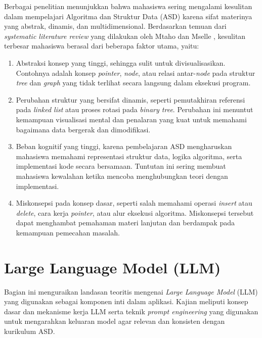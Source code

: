 Berbagai penelitian menunjukkan bahwa mahasiswa sering mengalami kesulitan dalam mempelajari Algoritma dan Struktur Data (ASD) karena sifat materinya yang abstrak, dinamis, dan multidimensional. Berdasarkan temuan dari \textit{systematic literature review} yang dilakukan oleh Mtaho dan Mselle \cite{Mtaho2024}, kesulitan terbesar mahasiswa berasal dari beberapa faktor utama, yaitu:

\begin{enumerate}
    \item Abstraksi konsep yang tinggi, sehingga sulit untuk divisualisasikan. Contohnya adalah konsep \textit{pointer}, \textit{node}, atau relasi antar-\textit{node} pada struktur \textit{tree} dan \textit{graph} yang tidak terlihat secara langsung dalam eksekusi program.

    \item Perubahan struktur yang bersifat dinamis, seperti pemutakhiran referensi pada \textit{linked list} atau proses rotasi pada \textit{binary tree}. Perubahan ini menuntut kemampuan visualisasi mental dan penalaran yang kuat untuk memahami bagaimana data bergerak dan dimodifikasi.

    \item Beban kognitif yang tinggi, karena pembelajaran ASD mengharuskan mahasiswa memahami representasi struktur data, logika algoritma, serta implementasi kode secara bersamaan. Tuntutan ini sering membuat mahasiswa kewalahan ketika mencoba menghubungkan teori dengan implementasi.

    \item Miskonsepsi pada konsep dasar, seperti salah memahami operasi \textit{insert} atau \textit{delete}, cara kerja \textit{pointer}, atau alur eksekusi algoritma. Miskonsepsi tersebut dapat menghambat pemahaman materi lanjutan dan berdampak pada kemampuan pemecahan masalah.
\end{enumerate}


\section{Large Language Model (LLM)}

Bagian ini menguraikan landasan teoritis mengenai \textit{Large Language Model} (LLM) yang digunakan sebagai komponen inti dalam aplikasi. Kajian meliputi konsep dasar dan mekanisme kerja LLM serta teknik \textit{prompt engineering} yang digunakan untuk mengarahkan keluaran model agar relevan dan konsisten dengan kurikulum ASD.

